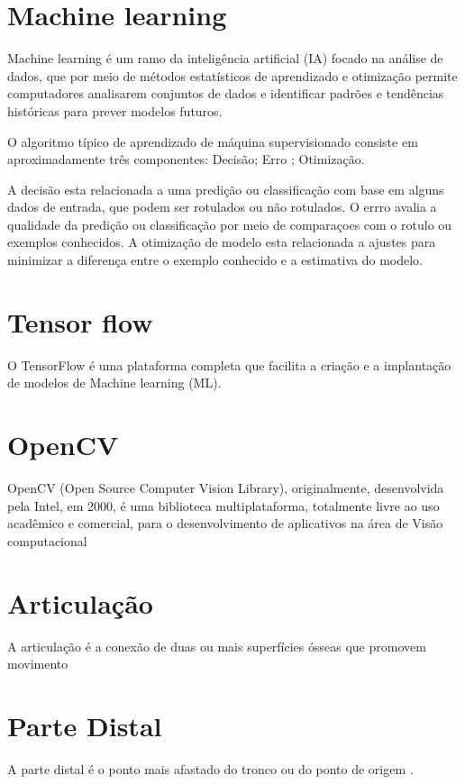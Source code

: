\section[Visão computacional]{Machine learning}

Machine learning é um ramo da inteligência artificial (IA) focado na análise de dados, que por meio de métodos estatísticos de aprendizado e otimização  permite computadores analisarem conjuntos de dados e identificar padrões e tendências históricas para prever modelos futuros.\cite{ml}

O algoritmo típico de aprendizado de máquina supervisionado consiste em aproximadamente três componentes: Decisão; Erro ; Otimização.

A decisão esta relacionada a uma predição ou classificação com base em alguns dados de entrada, que podem ser rotulados ou não rotulados. O errro avalia a qualidade da predição ou classificação por meio de comparaçoes com o rotulo ou exemplos conhecidos. A otimização de modelo esta relacionada a ajustes para minimizar a diferença entre o exemplo conhecido e a estimativa do modelo.



\section[Visão computacional]{Tensor flow}
O TensorFlow é uma plataforma completa que facilita a criação e a implantação de modelos de Machine learning (ML).



\section[Visão computacional]{OpenCV}
OpenCV (Open Source Computer Vision Library), originalmente, desenvolvida pela Intel, em 2000, é uma biblioteca multiplataforma, totalmente livre ao uso acadêmico e comercial, para o desenvolvimento de aplicativos na área de Visão computacional \cite{}




\section[Articulação]{Articulação}
A articulação é a conexão de duas ou mais superfícies ósseas que promovem movimento \cite{articulacao}

\section[Parte Distal]{Parte Distal}
A parte distal é o ponto mais afastado do tronco ou do ponto de origem \cite{distal}.


